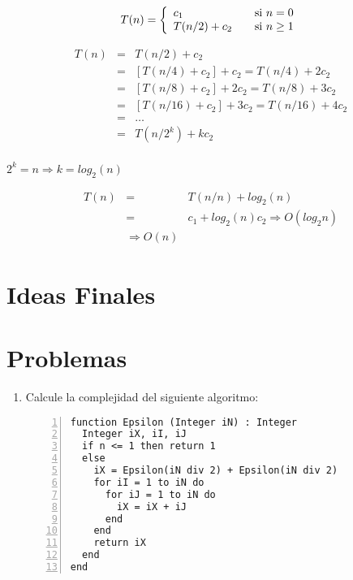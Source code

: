 \begin{equation}
T(n) = \left\{
  \begin{array}{l l}
    c_1 & \quad \text{si $n = 0$}\\
    T(n/2) + c_2& \quad \text{si $n \ge 1$}
  \end{array} \right.
\end{equation}

\begin{eqnarray*}
T(n)&=&T(n/2) + c_2\\
&=&\left [ T(n/4) + c_2\right ] + c_2 = T(n/4) + 2c_2\\
&=&\left [ T(n/8) + c_2\right ] + 2c_2 = T(n/8) + 3c_2\\
&=&\left [ T(n/16) + c_2\right ] + 3c_2 = T(n/16) + 4c_2\\
&=&\dots\\
&=&T(n/2^k) + kc_2\\
\end{eqnarray*}

$2^{k} = n \Rightarrow k = log_2(n)$

\begin{eqnarray*}
T(n)&=&T(n/n) + log_2(n)\\
&=&c_1 + log_2(n)c_2 \Rightarrow O(log_2n) \\
&\Rightarrow O(n)
\end{eqnarray*}
\section{Ideas Finales}

\section{Problemas}
\begin{enumerate}
\item Calcule la complejidad del siguiente algoritmo:
\begin{lstlisting}[upquote=true, language=pseudo, numbers=left]
function Epsilon (Integer iN) : Integer
  Integer iX, iI, iJ
  if n <= 1 then return 1
  else
    iX = Epsilon(iN div 2) + Epsilon(iN div 2)
    for iI = 1 to iN do
      for iJ = 1 to iN do
        iX = iX + iJ
      end
    end
    return iX
  end
end
\end{lstlisting}
\end{enumerate}
